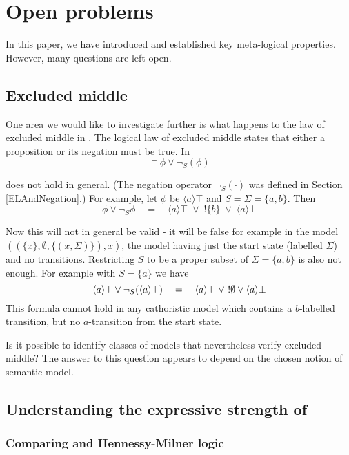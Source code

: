 \section{Open problems}\label{conclusion}

In this paper, we have introduced \cathoristic{} and established key
meta-logical properties. However,
many questions are left open. 

\subsection{Excluded middle}

One area we would like to investigate further is what happens to the law of excluded middle in \cathoristic{}.
The logical law of excluded middle states that either a proposition or
its negation must be true. In \cathoristic{}
\[
\models \phi \lor \neg_S(\phi)
\]

\NI does not hold in general. (The negation operator $\neg_{S}(\cdot)$
was defined in Section \ref{ELAndNegation}.) For example, let $\phi$ be
$\langle a \rangle \top$ and $S = \Sigma = \{a, b\}$.  Then
\[
   \phi \lor \neg_{S} \phi 
       \quad=\quad 
   \langle a \rangle \top \; \lor \; ! \{b\} \; \lor \; \langle a \rangle \bot
\]

\NI Now this will not in general be valid - it will be false for
example in the model $((\{x\}, \emptyset, \{(x, \Sigma)\}), x)$, the
model having just the start state (labelled $\Sigma$) and no transitions.
Restricting $S$ to be a proper subset of $\Sigma = \{a, b\}$ is also not
enough. For example with $S = \{a\}$ we have
\[
   \langle a \rangle \top \lor \neg_{S}(\langle a \rangle \top)
      \quad=\quad
   \langle a \rangle \top\ \lor\ !\emptyset \lor \langle a \rangle \bot
\]
This formula cannot hold in any cathoristic model which contains a
$b$-labelled transition, but no $a$-transition from the start state.

Is it possible to identify classes of models that nevertheless verify
excluded middle? The answer to this question appears to depend 
on the chosen notion of semantic model.

\subsection{Understanding the expressive strength of \cathoristic{}}

\subsubsection{Comparing \cathoristic{} and Hennessy-Milner logic}

